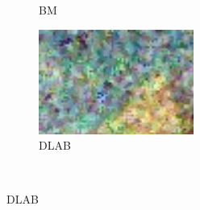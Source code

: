 \begin{figure}
{\begin{subfigure}[b]{0.25\textwidth}
			\caption{BM}
			\label{fig:bm}
		\end{subfigure}
		\begin{subfigure}[b]{0.25\textwidth}
			\centering
			\includegraphics[width=0.95\linewidth]{fig/DLAB}
			\caption{DLAB}
			\label{fig:dlab}
		\end{subfigure}
	}\\
\end{figure}
